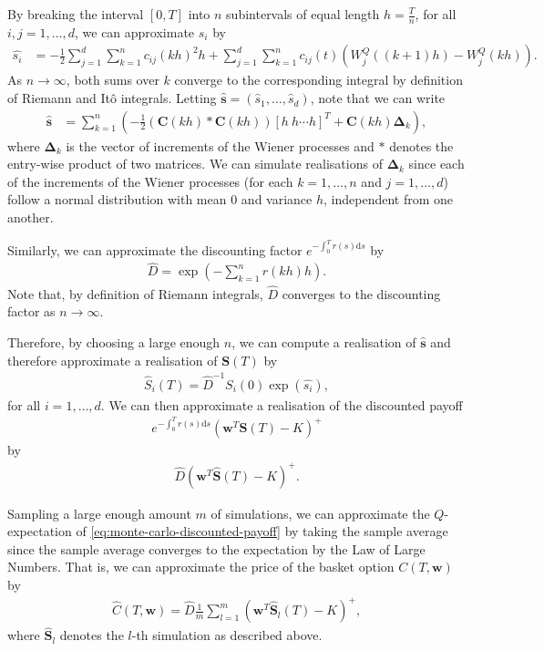 \documentclass[english]{article}
\numberwithin{equation}{section}
\numberwithin{figure}{section}
\theoremstyle{bolddescit}
\theoremstyle{definition}
\theoremstyle{definition}
\theoremstyle{plain}
\theoremstyle{plain}
\theoremstyle{bolddesc}
\theoremstyle{plain}
\theoremstyle{remark}
\begin{document}
By breaking the interval $[0,T]$ into $n$ subintervals of equal length $h = \frac{T}{n}$, for all $i,j=1,\ldots,d$, we can approximate $s_i$ by
\begin{align*}
  \hat{s_i} &= - \frac{1}{2} \sum_{j=1}^{d} \sum_{k=1}^{n} c_{ij}(kh)^2 h + \sum_{j=1}^{d} \sum_{k=1}^{n}  c_{ij}(t) (W^Q_j((k+1)h) - W^Q_j(kh)).
\end{align*}
As $n \to \infty$, both sums over $k$ converge to the corresponding integral by definition of Riemann and It\^o integrals. Letting $\hat{\mathbf{s}} = (\hat{s}_1,\ldots,\hat{s}_d)$, note that we can write
\begin{align*}
  \hat{\mathbf{s}} &= \sum_{k=1}^{n} \left( - \frac{1}{2} (\mathbf{C}(kh) * \mathbf{C}(kh)) [h\ h \cdots h]^T + \mathbf{C}(kh) \mathbf{\Delta}_k \right),
\end{align*}
where $\mathbf{\Delta}_k$ is the vector of increments of the Wiener processes and $*$ denotes the entry-wise product of two matrices. We can simulate realisations of $\mathbf{\Delta}_k$ since each of the increments of the Wiener processes (for each $k=1,\ldots,n$ and $j=1,\ldots,d$) follow a normal distribution with mean 0 and variance $h$, independent from one another.

Similarly, we can approximate the discounting factor $e^{-\int_0^T r(s) \mathrm{d}s}$ by
\begin{align*}
  \hat{D} = \exp \left(-\sum_{k=1}^{n} r(kh) h\right).
\end{align*}
Note that, by definition of Riemann integrals, $\hat{D}$ converges to the discounting factor as $n \to \infty$.

Therefore, by choosing a large enough $n$, we can compute a realisation of $\hat{\mathbf{s}}$ and therefore approximate a realisation of $\mathbf{S}(T)$ by
\begin{align*}
  \hat{S}_i(T) = \hat{D}^{-1} S_i(0) \exp\left(\hat{s_i}\right),
\end{align*}
for all $i=1,\ldots,d$. We can then approximate a realisation of the discounted payoff
\begin{align}\label{eq:monte-carlo-discounted-payoff}
  e^{-\int_0^T r(s) \mathrm{d}s} (\mathbf{w}^T \mathbf{S}(T) - K)^+
\end{align}
by
\begin{align*}
  \hat{D} (\mathbf{w}^T \hat{\mathbf{S}}(T) - K)^+.
\end{align*}

Sampling a large enough amount $m$ of simulations, we can approximate the $Q$-expectation of \eqref{eq:monte-carlo-discounted-payoff} by taking the sample average since the sample average converges to the expectation by the Law of Large Numbers. That is, we can approximate the price of the basket option $C(T,\mathbf{w})$ by
\begin{align*}
  \hat{C}(T,\mathbf{w}) = \hat{D} \frac{1}{m} \sum_{l=1}^{m} (\mathbf{w}^T \hat{\mathbf{S}}_l(T) - K)^+,
\end{align*}
where $\hat{\mathbf{S}}_l$ denotes the $l$-th simulation as described above.
\end{document}
